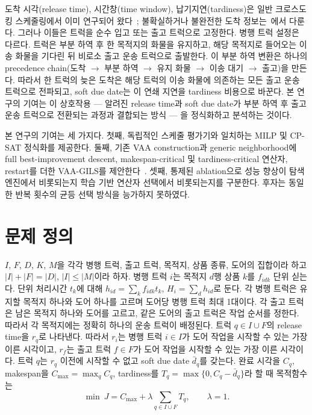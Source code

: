\documentclass[11pt,a4paper]{article}
\begin{document}
도착 시각(release time), 시간창(time window), 납기지연(tardiness)은 일반 크로스도킹 스케줄링에서 이미
연구되어
왔다~\cite{vanbelle2013,assadi2016,bodnar2017,molavi2018,rijal2019,li2026};
불확실하거나 불완전한 도착 정보는~\cite{larbi2011,konur2013,konurcost2013,ladier2016,xi2020}에서
다룬다. 그러나 이들은 트럭을 순수 입고 또는 출고 트럭으로 고정한다. 병행 트럭 설정은 다르다. 트럭은 부분 하역 후 한 목적지의 화물을 유지하고, 해당 목적지로
들어오는 이송 화물을 기다린 뒤 비로소 출고 운송 트럭으로 출발한다. 이 부분 하역 변환은
하나의 precedence chain(도착 $\to$ 부분 하역 $\to$ 유지 화물 $\to$
이송 대기 $\to$ 출고)을 만든다. 따라서 한 트럭의 늦은 도착은
해당 트럭의 이송 화물에 의존하는 모든 출고 운송 트럭으로 전파되고, soft due date는 이 연쇄
지연을 tardiness 비용으로 바꾼다. 본 연구의 기여는 이 상호작용 --- 알려진
release time과 soft due date가 부분 하역 후 출고 운송 트럭으로 전환되는 과정과 결합되는 방식 --- 을
정식화하고 분석하는 것이다.

본 연구의 기여는 세 가지다. 첫째, 독립적인 스케줄 평가기와 일치하는 MILP 및
CP-SAT 정식화를 제공한다. 둘째, 기존 VAA construction과 generic neighborhood에
full best-improvement descent, makespan-critical 및 tardiness-critical 연산자,
restart를 더한 VAA-GILS를 제안한다~\cite{shahmardan2020}. 셋째, 통제된
ablation으로 성능 향상이 탐색 엔진에서 비롯되는지 학습 기반 연산자 선택에서
비롯되는지를 구분한다. 후자는 동일한 반복 횟수의 균등 선택 방식을 능가하지 못하였다.

\section{문제 정의}

$I$, $F$, $D$, $K$, $M$을 각각 병행 트럭, 출고 트럭, 목적지, 상품 종류,
도어의 집합이라 하고 $|I|+|F|=|D|$, $|I|\le|M|$이라 하자. 병행 트럭 $i$는
목적지 $d$행 상품 $k$를 $f_{idk}$ 단위 싣는다. 단위 처리시간 $t_k$에 대해
$h_{id}=\sum_k f_{idk}t_k$, $H_i=\sum_d h_{id}$로 둔다. 각 병행 트럭은 유지할
목적지 하나와 도어 하나를 고르며 도어당 병행 트럭 최대 1대이다. 각 출고 트럭은
남은 목적지 하나와 도어를 고르고, 같은 도어의 출고 트럭은 작업 순서를 정한다. 따라서
각 목적지에는 정확히 하나의 운송 트럭이 배정된다. 트럭 $q\in I\cup F$의 release
time을 $r_q$로 나타낸다. 따라서 $r_i$는 병행 트럭 $i\in I$가 도어 작업을
시작할 수 있는 가장 이른 시각이고, $r_f$는 출고 트럭 $f\in F$가 도어 작업을
시작할 수 있는 가장 이른 시각이다. 트럭 $q$는 $r_q$ 이전에 시작할 수 없고 soft
due date $\bar d_q$를 갖는다. 완료 시각을 $C_q$,
makespan을 $C_{\max}=\max_q C_q$, tardiness를 $T_q=\max\{0,C_q-\bar d_q\}$라 할
때 목적함수는
\begin{equation}
\min\ J=C_{\max}+\lambda\sum_{q\in I\cup F}T_q,\qquad \lambda=1.
\label{eq:obj}
\end{equation}
\end{document}
